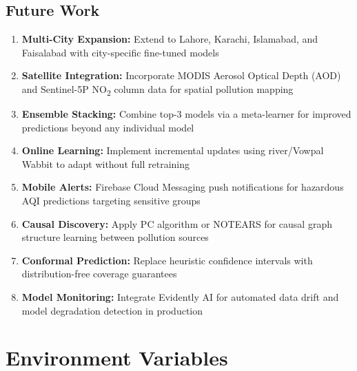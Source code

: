 \documentclass[12pt, a4paper, oneside]{article}
\begin{document}
\subsection{Future Work}

\begin{enumerate}
    \item \textbf{Multi-City Expansion:} Extend to Lahore, Karachi, Islamabad, and Faisalabad with city-specific fine-tuned models
    \item \textbf{Satellite Integration:} Incorporate MODIS Aerosol Optical Depth (AOD) and Sentinel-5P NO\textsubscript{2} column data for spatial pollution mapping
    \item \textbf{Ensemble Stacking:} Combine top-3 models via a meta-learner for improved predictions beyond any individual model
    \item \textbf{Online Learning:} Implement incremental updates using river/Vowpal Wabbit to adapt without full retraining
    \item \textbf{Mobile Alerts:} Firebase Cloud Messaging push notifications for hazardous AQI predictions targeting sensitive groups
    \item \textbf{Causal Discovery:} Apply PC algorithm or NOTEARS for causal graph structure learning between pollution sources
    \item \textbf{Conformal Prediction:} Replace heuristic confidence intervals with distribution-free coverage guarantees
    \item \textbf{Model Monitoring:} Integrate Evidently AI for automated data drift and model degradation detection in production
\end{enumerate}

\appendix
\section{Environment Variables}
\end{document}

